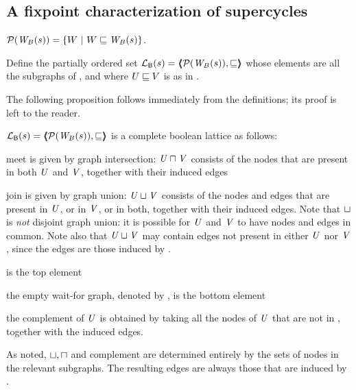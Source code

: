 \subsection{A fixpoint characterization of supercycles}
\label{secn:supercycle-fixpoint}

\begin{definition} \label{defn:wsetOfSubgraphs}
$\mathcal{P}(\mathit{W}_{B}({s})) = \{  W ~|~ W \sqsubseteq \mathit{W}_{B}({s})  \}$.
\end{definition}


\begin{definition} \label{defn:wflattice}
Define the partially ordered set $\mathcal{L}_{\mathsf{B}}({s}) = \langle \hspace{-0.34em} \langle \hspace{-0.34em} \langle  \mathcal{P}(\mathit{W}_{B}({s})), \sqsubseteq  \rangle \hspace{-0.34em} \rangle \hspace{-0.34em} \rangle$ %
whose elements are all the subgraphs of 
, and where  $U \sqsubseteq V$ is as in .   
\end{definition}

The following proposition follows immediately from the definitions; its proof is left to the reader.
\begin{proposition} \label{prop:isALattice}
$\mathcal{L}_{\mathsf{B}}({s}) = \langle \hspace{-0.34em} \langle \hspace{-0.34em} \langle  \mathcal{P}(\mathit{W}_{B}({s})), \sqsubseteq  \rangle \hspace{-0.34em} \rangle \hspace{-0.34em} \rangle$ is a complete boolean lattice as follows:
\be

\item meet is given by graph intersection: 
$\mathit{U} \sqcap \mathit{V}$ consists of the nodes that are present in both $\mathit{U}$ and $\mathit{V}$, together with their induced edges

\item join is given by graph union: $\mathit{U} \sqcup \mathit{V}$ consists of the nodes and edges that are present in $\mathit{U}$, or in $\mathit{V}$, or in both, together with their
  induced edges.
 Note that $\sqcup$ is \emph{not} disjoint graph union: 
it is possible for $\mathit{U}$ and $\mathit{V}$ to have nodes and edges in common. Note also that $\mathit{U} \sqcup \mathit{V}$ may contain edges not present in either $\mathit{U}$ nor $\mathit{V}$,
since the edges are those induced by  . 

\item {}  is the top element 

\item  the empty wait-for graph, denoted by \ewfg, is the bottom element

\item the complement of $\mathit{U}$ is \compl{\US} obtained by taking all the nodes of $\mathit{U}$ that are not in , together with the induced edges.
\ee
\end{proposition}
%
As noted, $\sqcup, \sqcap$ and complement are determined entirely by the sets of nodes in the relevant subgraphs. The resulting edges are always those
that are induced by .



